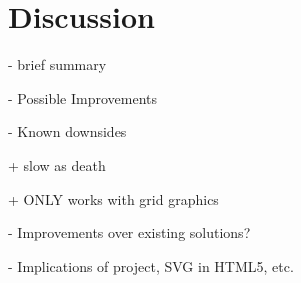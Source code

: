 \chapter{Discussion}

    - brief summary

    - Possible Improvements

    - Known downsides

      + slow as death

      + ONLY works with grid graphics

    - Improvements over existing solutions?

    - Implications of project, SVG in HTML5, etc.
